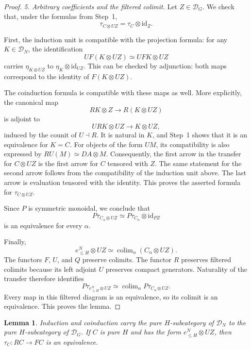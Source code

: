 \documentclass[11pt,reqno]{amsart}
\newtheorem{lemma}[theorem]{Lemma}
\theoremstyle{definition}
\theoremstyle{remark}
\theoremstyle{plain}
\numberwithin{equation}{section}
\DeclareMathOperator*{\colim}{colim}
\newcommand{\D}{\mathcal D}
\begin{document}
\begin{proof}
\smallskip
\noindent
\emph{5. Arbitrary coefficients and the filtered colimit.}
Let \(Z\in\D_G\).
We check that, under the formulas from Step~1,
\[
 \tau_{C\otimes UZ}
 =
 \tau_C\otimes\mathrm{id}_Z.
\]

First, the induction unit is compatible with the projection
formula: for any \(K\in\D_N\), the identification
\[
 UF(K\otimes UZ)\simeq UFK\otimes UZ
\]
carries \(\eta_{K\otimes UZ}\) to
\(\eta_K\otimes\mathrm{id}_{UZ}\).
This can be checked by adjunction: both maps correspond to the
identity of \(F(K\otimes UZ)\).

The coinduction formula is compatible with these maps as well.
More explicitly, the canonical map
\[
 RK\otimes Z\longrightarrow R(K\otimes UZ)
\]
is adjoint to
\[
 URK\otimes UZ\longrightarrow K\otimes UZ,
\]
induced by the counit of \(U\dashv R\).
It is natural in \(K\), and Step~1 shows that it is an
equivalence for \(K=C\).
For objects of the form \(UM\), its compatibility is also
expressed by \(RU(M)\simeq DA\otimes M\).
Consequently, the first arrow in the transfer for \(C\otimes UZ\)
is the first arrow for \(C\) tensored with \(Z\).
The same statement for the second arrow follows from the
compatibility of the induction unit above.
The last arrow is evaluation tensored with the identity.
This proves the asserted formula for \(\tau_{C\otimes UZ}\).

Since \(P\) is symmetric monoidal, we conclude that
\[
 P\tau_{C_\alpha\otimes UZ}
 \simeq P\tau_{C_\alpha}\otimes\mathrm{id}_{PZ}
\]
is an equivalence for every \(\alpha\).

Finally,
\[
 e_{\le H}^N\otimes UZ
 \simeq\colim_\alpha(C_\alpha\otimes UZ).
\]
The functors \(F\), \(U\), and \(Q\) preserve colimits.
The functor \(R\) preserves filtered colimits because its left
adjoint \(U\) preserves compact generators.
Naturality of the transfer therefore identifies
\[
 P\tau_{e_{\le H}^N\otimes UZ}
 \simeq
 \colim_\alpha P\tau_{C_\alpha\otimes UZ}.
\]
Every map in this filtered diagram is an equivalence, so its
colimit is an equivalence. This proves the lemma.
\end{proof}

\begin{lemma}\label{lem:td-pure-transfer}
Induction and coinduction carry the pure \(H\)-subcategory of
\(\D_N\) to the pure \(H\)-subcategory of \(\D_G\).
If \(C\) is pure \(H\) and has the form
\(e_{\le H}^N\otimes UZ\), then \(\tau_C:RC\to FC\) is an equivalence.
\end{lemma}
\end{document}
